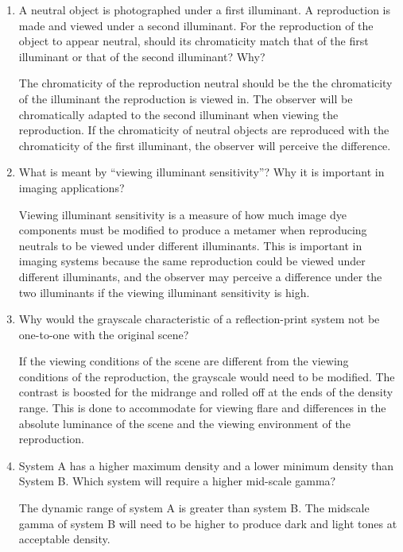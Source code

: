 \documentclass{amsart}
\theoremstyle{definition}
\theoremstyle{remark}
\numberwithin{equation}{section}
\begin{document}
\begin{enumerate}
 \item  A neutral object is
photographed under a first illuminant. A reproduction is made and
viewed under a second illuminant. For the reproduction of the
object to appear neutral, should its chromaticity match that of
the first illuminant or that of the second illuminant? Why?
\newline
\par
The chromaticity of the reproduction neutral should be the the
chromaticity of the illuminant the reproduction is viewed in.  The
observer will be chromatically adapted to the second illuminant
when viewing the reproduction.  If the chromaticity of neutral
objects are reproduced with the chromaticity of the first
illuminant, the observer will perceive the difference.
\newline

\item  What is meant by “viewing illuminant sensitivity”? Why it
is important in imaging applications?
\newline
\par Viewing illuminant sensitivity is a measure of how much image dye components must be modified to produce a
metamer when reproducing neutrals to be viewed under different
illuminants.   This is important in imaging systems because the
same reproduction could be viewed under different illuminants, and
the observer may perceive a difference under the two illuminants
if the viewing illuminant sensitivity is high.
\newline

\item Why would the grayscale characteristic of a reflection-print
system not be one-to-one with the original scene?
\newline
\par If the viewing conditions of the scene are different from the viewing
conditions of the reproduction, the grayscale would need to be
modified.  The contrast is boosted for the midrange and rolled off
at the ends of the density range.  This is done to accommodate for
viewing flare and differences in the absolute luminance of the
scene and the viewing environment of the reproduction.

\item  System A has a higher maximum density and a lower minimum
density than System B. Which system will require a higher
mid-scale gamma?
\newline
\par The dynamic range of system A is greater than system B.  The
midscale gamma of system B will need to be higher to produce dark
and light tones at acceptable density.


\end{enumerate}
\end{document}
